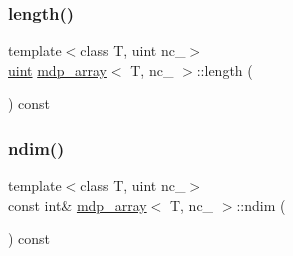\mbox{\label{classmdp__array_a702c88d9f7db9b6e86184a98cf85e617}} 
\subsubsection{\texorpdfstring{length()}{length()}\hspace{0.1cm}{\footnotesize\ttfamily [2/2]}}
{\footnotesize\ttfamily template$<$class T, uint nc\+\_\+$>$ \\
\hyperlink{mdp__global__vars_8h_a91ad9478d81a7aaf2593e8d9c3d06a14}{uint} \hyperlink{classmdp__array}{mdp\+\_\+array}$<$ T, nc\+\_\+ $>$\+::length (\begin{DoxyParamCaption}{ }\end{DoxyParamCaption}) const\hspace{0.3cm}{\ttfamily [inline]}}

\mbox{\label{classmdp__array_af02f14ceeabfffe09035f8d06222c174}} 
\subsubsection{\texorpdfstring{ndim()}{ndim()}}
{\footnotesize\ttfamily template$<$class T, uint nc\+\_\+$>$ \\
const int\& \hyperlink{classmdp__array}{mdp\+\_\+array}$<$ T, nc\+\_\+ $>$\+::ndim (\begin{DoxyParamCaption}{ }\end{DoxyParamCaption}) const\hspace{0.3cm}{\ttfamily [inline]}}

\mbox{\label{classmdp__array_a9e3a7e699387fb78562fb8d9c9ebea57}} 

